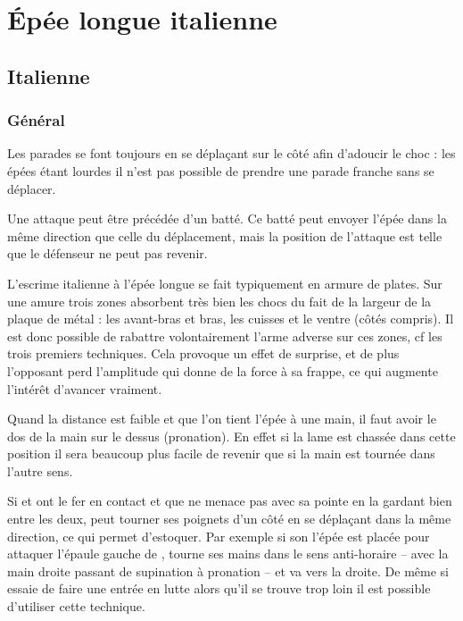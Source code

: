 \chapter{Épée longue italienne}


\section{Italienne}


\subsection{Général}



Les parades se font toujours en se déplaçant sur le côté afin d'adoucir le choc : les épées étant lourdes il n'est pas possible de prendre une parade franche sans se déplacer.

Une attaque peut être précédée d'un batté.
Ce batté peut envoyer l'épée dans la même direction que celle du déplacement, mais la position de l'attaque est telle que le défenseur ne peut pas revenir.

L'escrime italienne à l'épée longue se fait typiquement en armure de plates.
Sur une amure trois zones absorbent très bien les chocs du fait de la largeur de la plaque de métal : les avant-bras et bras, les cuisses et le ventre (côtés compris).
Il est donc possible de rabattre volontairement l'arme adverse sur ces zones, cf les trois premiers techniques.
Cela provoque un effet de surprise, et de plus l'opposant perd l'amplitude qui donne de la force à sa frappe, ce qui augmente l'intérêt d'avancer vraiment.

Quand la distance est faible et que l'on tient l'épée à une main, il faut avoir le dos de la main sur le dessus (pronation).
En effet si la lame est chassée dans cette position il sera beaucoup plus facile de revenir que si la main est tournée dans l'autre sens.

Si \A et \D ont le fer en contact et que \A ne menace pas \D avec sa pointe en la gardant bien entre les deux, \D peut tourner ses poignets d'un côté en se déplaçant dans la même direction, ce qui permet d'estoquer.
Par exemple si son l'épée est placée pour attaquer l'épaule gauche de \A, \D tourne ses mains dans le sens anti-horaire – avec la main droite passant de supination à pronation – et va vers la droite.
De même si \A essaie de faire une entrée en lutte alors qu'il se trouve trop loin il est possible d'utiliser cette technique.



